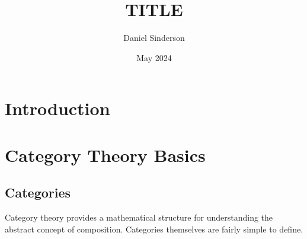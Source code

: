 \documentclass{article}
\title{TITLE}
\author{Daniel Sinderson}
\date{May 2024}
\theoremstyle{definition}
\begin{document}
\maketitle

\section*{Introduction}




\section*{Category Theory Basics}
\subsection*{Categories}
Category theory provides a mathematical structure for understanding the abstract concept of composition.
Categories themselves are fairly simple to define.
\end{document}
